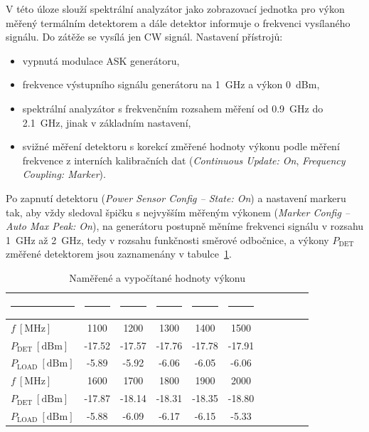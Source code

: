 \documentclass[11pt,a4paper]{article}
\begin{document}
V této úloze slouží spektrální analyzátor jako zobrazovací jednotka pro výkon měřený termálním detektorem a dále detektor informuje o frekvenci vysílaného signálu. Do zátěže se vysílá jen CW signál. Nastavení přístrojů:
\begin{itemize}
    \item vypnutá modulace ASK generátoru,
    \item frekvence výstupního signálu generátoru na 1~GHz a výkon 0~dBm,
    \item spektrální analyzátor s frekvenčním rozsahem měření od 0.9~GHz do 2.1~GHz, jinak v základním nastavení,
    \item svižné měření detektoru s korekcí změřené hodnoty výkonu podle měření frekvence z interních kalibračních dat (\emph{Continuous Update: On}, \emph{Frequency Coupling: Marker}).
\end{itemize}
Po zapnutí detektoru (\emph{Power Sensor Config -- State: On}) a nastavení markeru tak, aby vždy sledoval špičku s nejvyšším měřeným výkonem (\emph{Marker Config -- Auto Max Peak: On}), na generátoru postupně měníme frekvenci signálu v rozsahu 1~GHz až 2~GHz, tedy v rozsahu funkčnosti směrové odbočnice, a výkony $P_{\mathrm{DET}}$ změřené detektorem jsou zaznamenány v tabulce~\ref{table:task2-data}.
\begin{table}[!ht]
    \centering
    \begin{tabular}{|l||c|c|c|c|c|c|c|c|c|c|}
        \rule{2cm}{0pt} & \rule{1.5cm}{0pt} & \rule{1.5cm}{0pt} & \rule{1.5cm}{0pt} & \rule{1.5cm}{0pt} & \rule{1.5cm}{0pt}\\[-\arraystretch\normalbaselineskip]
        \hline
        $f\ [\mathrm{MHz}]$ & 1100 & 1200 & 1300 & 1400 & 1500\\
        \hline
        $P_{\mathrm{DET}} \ [\mathrm{dBm}]$ & -17.52 & -17.57 & -17.76 & -17.78 & -17.91\\
        \hline
        $P_{\mathrm{LOAD}} \ [\mathrm{dBm}]$ & -5.89 & -5.92 & -6.06 & -6.05 & -6.06\\
        \hline\hline
        $f\ [\mathrm{MHz}]$ & 1600 & 1700 & 1800 & 1900 & 2000\\
        \hline
        $P_{\mathrm{DET}} \ [\mathrm{dBm}]$ & -17.87 & -18.14 & -18.31 & -18.35 & -18.80\\
        \hline
        $P_{\mathrm{LOAD}} \ [\mathrm{dBm}]$ & -5.88 & -6.09 & -6.17 & -6.15 & -5.33\\
        \hline
    \end{tabular}
    \caption{\label{table:task2-data}Naměřené a vypočítané hodnoty výkonu}
\end{table}
\end{document}
